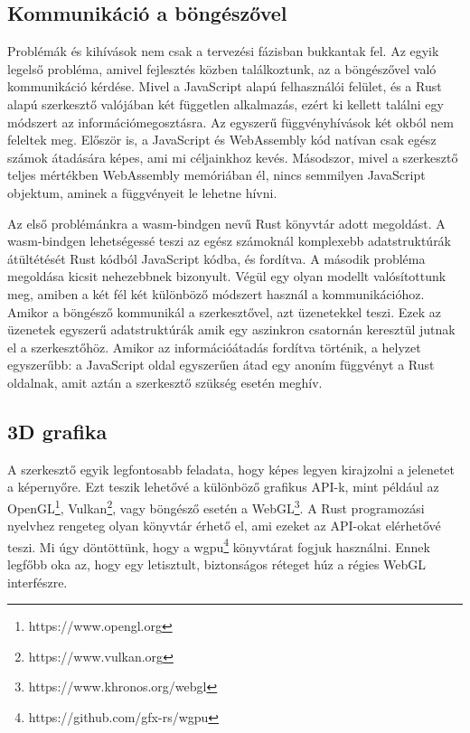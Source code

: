 \subsection{Kommunikáció a böngészővel}

Problémák és kihívások nem csak a tervezési fázisban bukkantak fel. Az egyik legelső probléma,
amivel fejlesztés közben találkoztunk, az a böngészővel való kommunikáció kérdése. Mivel a
JavaScript alapú felhasználói felület, és a Rust alapú szerkesztő valójában két független
alkalmazás, ezért ki kellett találni egy módszert az információmegosztásra. Az egyszerű
függvényhívások két okból nem feleltek meg. Először is, a JavaScript és WebAssembly kód natívan
csak egész számok átadására képes, ami mi céljainkhoz kevés. Másodszor, mivel a szerkesztő teljes
mértékben WebAssembly memóriában él, nincs semmilyen JavaScript objektum, aminek a függvényeit le
lehetne hívni.

Az első problémánkra a wasm-bindgen nevű Rust könyvtár adott megoldást. A wasm-bindgen lehetségessé
teszi az egész számoknál komplexebb adatstruktúrák átültétését Rust kódból JavaScript kódba, és
fordítva. A második probléma megoldása kicsit nehezebbnek bizonyult. Végül egy olyan
modellt valósítottunk meg, amiben a két fél két különböző módszert használ a kommunikációhoz.
Amikor a böngésző kommunikál a szerkesztővel, azt üzenetekkel teszi. Ezek az üzenetek egyszerű
adatstruktúrák amik egy aszinkron csatornán keresztül jutnak el a szerkesztőhöz. Amikor az
információátadás fordítva történik, a helyzet egyszerűbb: a JavaScript oldal egyszerűen átad egy
anoním függvényt a Rust oldalnak, amit aztán a szerkesztő szükség esetén meghív.

\subsection{3D grafika}

A szerkesztő egyik legfontosabb feladata, hogy képes legyen kirajzolni a jelenetet a képernyőre.
Ezt teszik lehetővé a különböző grafikus API-k, mint például az
OpenGL\footnote{https://www.opengl.org}, Vulkan\footnote{https://www.vulkan.org},
vagy böngésző esetén a WebGL\footnote{https://www.khronos.org/webgl}.
A Rust programozási nyelvhez rengeteg olyan könyvtár érhető el, ami ezeket az API-okat elérhetővé
teszi. Mi úgy döntöttünk, hogy a wgpu\footnote{https://github.com/gfx-rs/wgpu} könyvtárat fogjuk
használni. Ennek legfőbb oka az, hogy egy letisztult, biztonságos réteget húz a régies WebGL
interfészre.

